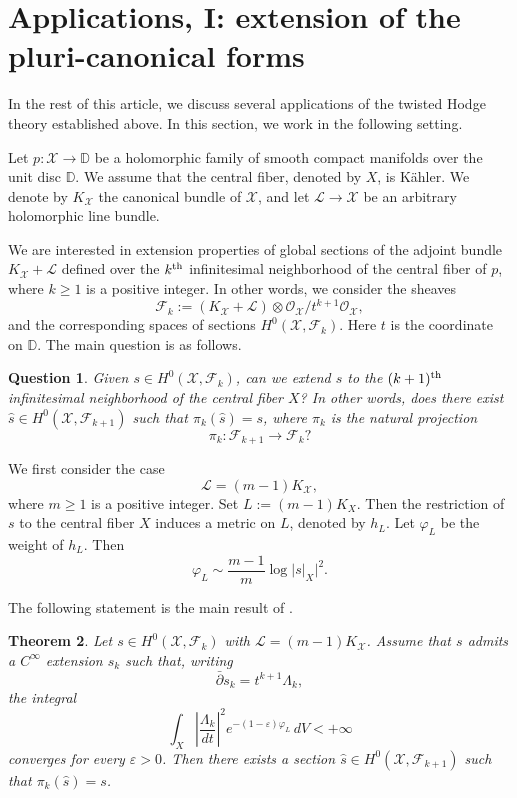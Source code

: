 \documentclass[english]{amsart}
\newcommand{\DD}{\mathbb D}
\newcommand{\wh}{\widehat}
\newcommand{\cX}{\mathcal{X}}
\newcommand{\cF}{\mathcal{F}}
\newcommand{\Lie}{\mathcal{L}}
\renewcommand{\O}{\mathcal{O}}
\newcommand{\ep}{\varepsilon}
\renewcommand{\ge}{\geqslant}
\newcommand{\dbar}{\bar \partial}
\newtheorem{thm}{Theorem}[section]
\newtheorem{quest}[thm]{Question}
\numberwithin{equation}{thm}
\begin{document}
	
		
\section{Applications, I: extension of the pluri-canonical forms}\label{extenpluri}

In the rest of this article, we discuss several applications of the twisted Hodge theory established above. In this section, we work in the following setting.

Let $p:\cX\to \DD$ be a holomorphic family of smooth compact manifolds over the unit disc $\DD$. We assume that the central fiber, denoted by $X$, is K\"ahler. We denote by $K_\cX$ the canonical bundle of $\cX$, and let $\Lie \to \cX$ be an arbitrary holomorphic line bundle.

We are interested in extension properties of global sections of the adjoint bundle $K_\cX+\Lie$ defined over the $k^{\rm th}$ infinitesimal neighborhood of the central fiber of $p$, where $k\ge 1$ is a positive integer. In other words, we consider the sheaves
\begin{equation}\label{intr1}
	\cF_k := (K_\cX+\Lie)\otimes \O_\cX / t^{k+1}\O_\cX,
\end{equation}
and the corresponding spaces of sections $H^0(\cX,\cF_k)$. Here $t$ is the coordinate on $\DD$. The main question is as follows.

\begin{quest}
	Given $s\in H^0(\cX,\cF_k)$, can we extend $s$ to the $(k+1)^{\rm th}$ infinitesimal neighborhood of the central fiber $X$? In other words, does there exist $\wh s\in H^0(\cX,\cF_{k+1})$ such that $\pi_k(\wh s)=s$, where $\pi_k$ is the natural projection
	\begin{equation}\label{intr2}
		\pi_k:\cF_{k+1}\to \cF_k?
	\end{equation}
\end{quest}

\medskip

We first consider the case
\[
\Lie = (m-1)K_\cX,
\]
where $m\ge 1$ is a positive integer. Set $L:=(m-1)K_X$. Then the restriction of $s$ to the central fiber $X$ induces a metric on $L$, denoted by $h_L$. Let $\varphi_L$ be the weight of $h_L$. Then
\[
\varphi_L \sim \frac{m-1}{m}\log |s|_X|^2.
\]

\medskip

\noindent
The following statement is the main result of \cite{CP-inv}.

\begin{thm}\label{MT}\cite[Thm 1.1]{CP-inv}
	Let $s\in H^0(\cX,\cF_k)$ with $\Lie=(m-1)K_\cX$. Assume that $s$ admits a $C^\infty$ extension $s_k$ such that, writing
	\[
	\dbar s_k = t^{k+1}\Lambda_k,
	\]
	the integral
	\begin{equation}\label{intr7}
		\int_X \left|\frac{\Lambda_k}{dt}\right|^2 e^{-(1-\ep)\varphi_L}\, dV <  + \infty
	\end{equation}
	converges for every $\ep>0$.
	Then there exists a section $\wh s\in H^0(\cX,\cF_{k+1})$ such that $\pi_k(\wh s)=s$.
\end{thm}
\end{document}
